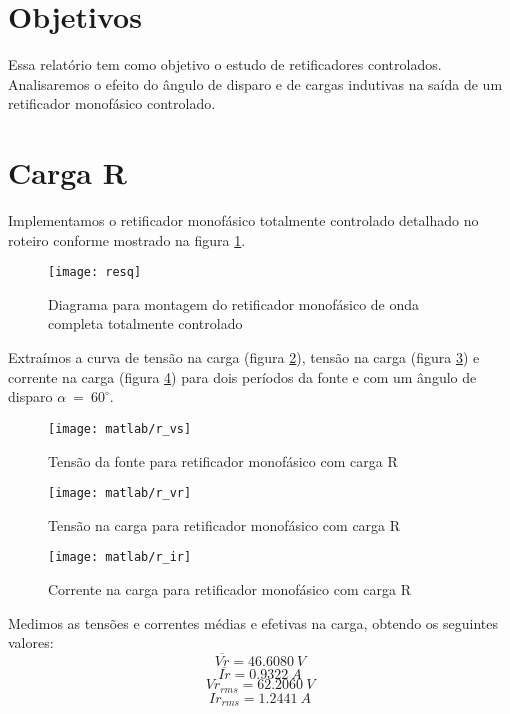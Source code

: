 \documentclass{report}
\begin{document}


\onehalfspacing
\section{Objetivos}
	Essa relatório tem como objetivo o estudo de retificadores controlados. Analisaremos o efeito do ângulo de disparo e de cargas indutivas na saída de um retificador monofásico controlado.
	 
\section{Carga R}
Implementamos o retificador monofásico totalmente controlado detalhado no roteiro conforme mostrado na figura \ref{fig:resq}.
\begin{figure}[H]
	\centering
	\texttt{[image: resq]}
	\caption{Diagrama para montagem do retificador monofásico de onda completa totalmente controlado}
	\label{fig:resq}
\end{figure}

Extraímos a curva de tensão na carga (figura \ref{fig:rvs}), tensão na carga (figura \ref{fig:rvr}) e corrente na carga (figura \ref{fig:rir}) para dois períodos da fonte e com um ângulo de disparo $\alpha\ =\ 60^\circ$.
\begin{figure}[H]
	\centering
	\texttt{[image: matlab/r\_vs]}
	\caption{Tensão da fonte para retificador monofásico com carga R}
	\label{fig:rvs}
\end{figure}
\begin{figure}[H]
	\centering
	\texttt{[image: matlab/r\_vr]}
	\caption{Tensão na carga para retificador monofásico com carga R}
	\label{fig:rvr}
\end{figure}
\begin{figure}[H]
	\centering
	\texttt{[image: matlab/r\_ir]}
	\caption{Corrente na carga para retificador monofásico com carga R}
	\label{fig:rir}
\end{figure}

Medimos as tensões e correntes médias e efetivas na carga, obtendo os seguintes valores:
\begin{equation}
\overline{Vr} = 46.6080\ V
\end{equation}
\begin{equation}
\overline{Ir} = 0.9322\ A
\end{equation}
\begin{equation}
Vr_{rms} =  62.2060\ V
\end{equation}
\begin{equation}
Ir_{rms} =  1.2441\ A
\end{equation}
\end{document}
